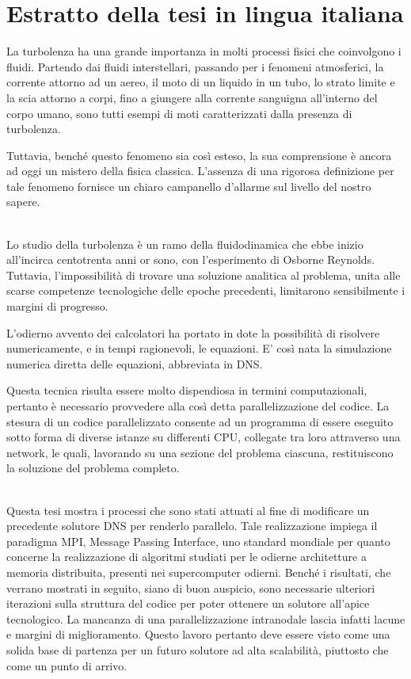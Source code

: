 \cleardoublepage
\thispagestyle{empty}
\section*{Estratto della tesi in lingua italiana}
La turbolenza ha una grande importanza in molti processi fisici che coinvolgono i fluidi. Partendo dai fluidi interstellari, passando per i fenomeni atmosferici, la corrente attorno ad un aereo, il moto di un liquido in un tubo, lo strato limite e la scia attorno a corpi, fino a giungere alla corrente sanguigna all’interno del corpo umano, sono tutti esempi di moti caratterizzati dalla presenza di turbolenza.\par
Tuttavia, benché questo fenomeno sia così esteso, la sua comprensione è ancora ad oggi un mistero della fisica classica. L'assenza di una rigorosa definizione per tale fenomeno fornisce un chiaro campanello d'allarme sul livello del nostro sapere.\\~\par

Lo studio della turbolenza è un ramo della fluidodinamica che ebbe inizio all'incirca centotrenta anni or sono, con l'esperimento di Osborne Reynolds.
Tuttavia, l'impossibilità di trovare una soluzione analitica al problema, unita alle scarse competenze tecnologiche delle epoche precedenti, limitarono sensibilmente i margini di progresso.\par
L'odierno avvento dei calcolatori ha portato in dote la possibilità di risolvere numericamente, e in tempi ragionevoli, le equazioni. 
E' così nata la simulazione numerica diretta delle equazioni, abbreviata in DNS.\par
Questa tecnica risulta essere molto dispendiosa in termini computazionali, pertanto è necessario provvedere alla così detta parallelizzazione del codice. La stesura di un codice parallelizzato consente ad un programma di essere eseguito sotto forma di diverse istanze su differenti CPU, collegate tra loro attraverso una network, le quali, lavorando su una sezione del problema ciascuna, restituiscono la soluzione del problema completo. \\~\par

Questa tesi mostra i processi che sono stati attuati al fine di modificare un precedente solutore DNS per renderlo parallelo.
Tale realizzazione impiega il paradigma MPI, Message Passing Interface, uno standard mondiale per quanto concerne la realizzazione di algoritmi studiati per le odierne architetture a memoria distribuita, presenti nei supercomputer odierni. Benché i risultati, che verrano mostrati in seguito, siano di buon auspicio, sono necessarie ulteriori iterazioni sulla struttura del codice per poter ottenere un solutore all'apice tecnologico. La mancanza di una parallelizzazione intranodale lascia infatti lacune e margini di miglioramento. Questo lavoro pertanto deve essere visto come una solida base di partenza per un futuro solutore ad alta scalabilità, piuttosto che come un punto di arrivo.\\~\par

